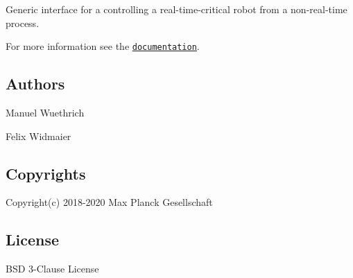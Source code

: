 Generic interface for a controlling a real-\/time-\/critical robot from a non-\/real-\/time process.

For more information see the \href{https://open-dynamic-robot-initiative.github.io/code_documentation/robot_interfaces/docs/doxygen/html/index.html}{\tt documentation}.

\subsection*{Authors}


\begin{DoxyItemize}
\item Manuel Wuethrich
\item Felix Widmaier
\end{DoxyItemize}

\subsection*{Copyrights}

Copyright(c) 2018-\/2020 Max Planck Gesellschaft

\subsection*{License}

B\+SD 3-\/\+Clause License 